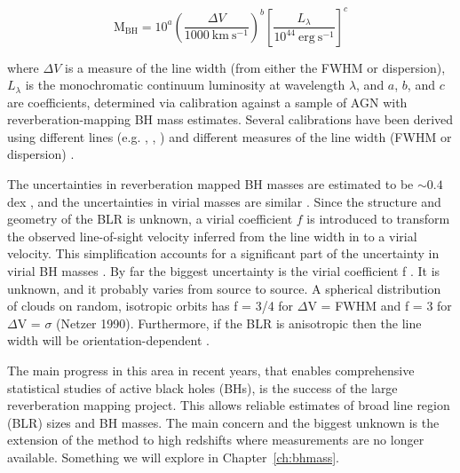 \begin{equation}
  \label{eq:virialmass}
  \mathrm{M_{BH}} = 10^{a} \left( \frac{\Delta V}{1000~\mathrm{km~s^{-1}}} \right)^b \left[ \frac{L_{\lambda}}{10^{44}~\mathrm{erg~s^{-1}}} \right]^c
\end{equation}

\noindent where $\Delta V$ is a measure of the line width (from either the FWHM or dispersion), $L_\lambda$ is the monochromatic continuum luminosity at wavelength $\lambda$, and $a$, $b$, and $c$ are coefficients, determined via calibration against a sample of AGN with reverberation-mapping BH mass estimates. Several calibrations have been derived using different lines (e.g. \hbns, , ) and different measures of the line width (FWHM or dispersion) \citep[e.g.][]{vestergaard02,mclure02,vestergaard06,mcgill08,wang09,rafiee11,park13}.

The uncertainties in reverberation mapped BH masses are estimated to be $\sim 0.4$ dex \citep[e.g.][]{peterson10}, and the uncertainties in virial masses are similar \citep[e.g.][]{vestergaard06}.
Since the structure and geometry of the BLR is unknown, a virial coefficient $f$ is introduced to transform the observed line-of-sight velocity inferred from the line width in to a virial velocity.
This simplification accounts for a significant part of the uncertainty in virial BH masses \citep[in addition to, for example, describing the BLR with a single radius $R$ and scatter in the $R-L$ relation;][]{shen13}. 
By far the biggest uncertainty is the virial coefficient f . 
It is unknown, and it probably varies from source to source.
A spherical distribution of clouds on random, isotropic orbits has f = 3/4 for $\Delta$V = FWHM and
f = 3 for $\Delta$V = $\sigma$ (Netzer 1990).
Furthermore, if the BLR is anisotropic \citep[for example, in a flattened disk; e.g.][]{jarvis06} then the line width will be orientation-dependent \citep[e.g.][]{runnoe13b,shen14,brotherton15}. 

The main progress in this area in recent years, that enables comprehensive statistical studies of active black holes (BHs), is the success of the large reverberation mapping project. 
This allows reliable estimates of broad line region (BLR) sizes and BH masses. 
The main concern and the biggest unknown is the extension of the method to high redshifts where \hb measurements are no longer available. 
Something we will explore in Chapter~\ref{ch:bhmass}. 

